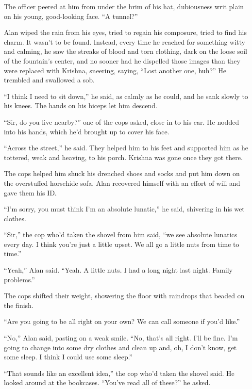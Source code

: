 The officer peered at him from under the brim of his hat, dubiousness
writ plain on his young, good-looking face.  ``A tunnel?''

Alan wiped the rain from his eyes, tried to regain his composure,
tried to find his charm.  It wasn't to be found.  Instead, every time
he reached for something witty and calming, he saw the streaks of
blood and torn clothing, dark on the loose soil of the fountain's
center, and no sooner had he dispelled those images than they were
replaced with Krishna, sneering, saying, ``Lost another one, huh?'' He
trembled and swallowed a sob.

``I think I need to sit down,'' he said, as calmly as he could, and he
sank slowly to his knees.  The hands on his biceps let him descend.

``Sir, do you live nearby?'' one of the cops asked, close in to his
ear.  He nodded into his hands, which he'd brought up to cover his
face.

``Across the street,'' he said.  They helped him to his feet and
supported him as he tottered, weak and heaving, to his porch.  Krishna
was gone once they got there.

The cops helped him shuck his drenched shoes and socks and put him
down on the overstuffed horsehide sofa.  Alan recovered himself with
an effort of will and gave them his ID.

``I'm sorry, you must think I'm an absolute lunatic,'' he said,
shivering in his wet clothes.

``Sir,'' the cop who'd taken the shovel from him said, ``we see
absolute lunatics every day.  I think you're just a little upset.  We
all go a little nuts from time to time.''

``Yeah,'' Alan said.  ``Yeah.  A little nuts.  I had a long night last
night.  Family problems.''

The cops shifted their weight, showering the floor with raindrops that
beaded on the finish.

``Are you going to be all right on your own?  We can call someone if
you'd like.''

``No,'' Alan said, pasting on a weak smile.  ``No, that's all right. 
I'll be fine.  I'm going to change into some dry clothes and clean up
and, oh, I don't know, get some sleep.  I think I could use some
sleep.''

``That sounds like an excellent idea,'' the cop who'd taken the shovel
said.  He looked around at the bookcases.  ``You've read all of
these?'' he asked.

